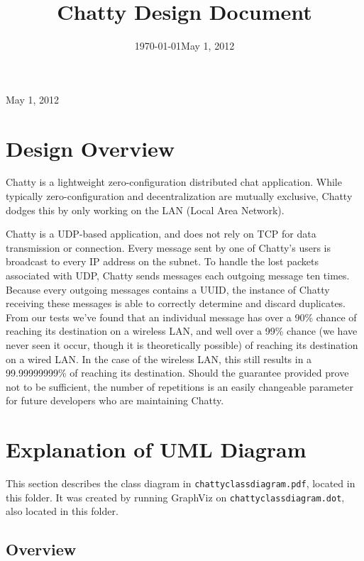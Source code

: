\documentclass[oneside,article]{memoir}
\date[\mydate]{\today}
\def\myauthor{Author}
\def\mytitle{Title}
\def\mytitle{Chatty Design Document}
\def\myauthor{Thomas Chiovoloni, Ricky Riggot, Mevludin Guster}
\def\mydate{May 1, 2012}
\def\myauthor{\latexauthor}
\begin{document}
\title{\mytitle}
\author{\myauthor}
\ifx\mydate\undefined
\else
\date{\mydate}
\fi
\mainmatter
\maketitle
\setlength{\parindent}{0pt}
\setlength{\parindent}{1em}

\chapter{Design Overview}
\label{designoverview}

Chatty is a lightweight zero-configuration distributed chat
application. While typically zero-configuration and decentralization
are mutually exclusive, Chatty dodges this by only working on the LAN
(Local Area Network).

Chatty is a UDP-based application, and does not rely on TCP for data
transmission or connection. Every message sent by one of Chatty's
users is broadcast to every IP address on the subnet. To handle the
lost packets associated with UDP, Chatty sends messages each outgoing
message ten times. Because every outgoing messages contains a UUID,
the instance of Chatty receiving these messages is able to correctly
determine and discard duplicates. From our tests we've found that an
individual message has over a 90\% chance of reaching its destination
on a wireless LAN, and well over a 99\% chance (we have never seen it
occur, though it is theoretically possible) of reaching its
destination on a wired LAN. In the case of the wireless LAN, this
still results in a 99.99999999\% of reaching its destination. Should
the guarantee provided prove not to be sufficient, the number of
repetitions is an easily changeable parameter for future developers
who are maintaining Chatty.

\chapter{Explanation of UML Diagram}
\label{explanationofumldiagram}

This section describes the class diagram in \texttt{chattyclassdiagram.pdf},
located in this folder. It was created by running GraphViz on
\texttt{chattyclassdiagram.dot}, also located in this folder.

\section{Overview}
\label{overview}
\end{document}
